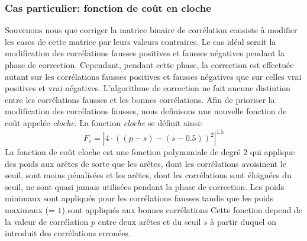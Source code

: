 \documentclass[onecolumn, 12pt]{book}
\begin{document}
\subsubsection{Cas particulier: fonction de co\^ut en cloche}
Souvenons nous que corriger la matrice binaire de corr\'elation consiste \`a modifier les cases de cette matrice par leurs valeurs contraires.
Le cas id\'eal serait la modification des corr\'elations fausses positives et fausses n\'egatives pendant la phase de correction.
Cependant, pendant cette phase, la correction est effectu\'ee autant sur les corr\'elations fausses positives et fausses n\'egatives que sur celles vrai positives et vrai n\'egatives.
L'algorithme de correction ne fait aucune distintion entre les corr\'elations fausses et les bonnes corr\'elations.
Afin de prioriser la modification des corr\'elations fausses, nous definisons une nouvelle fonction de co\^ut appel\'ee {\em cloche}.
\newline
La fonction {\em cloche} se d\'efinit ainsi:
\begin{equation}
	F_c = | 4\cdot((p-s) - (s-0.5))^2 |^{1.5}  
\end{equation}
La fonction de co\^ut cloche est une fonction polynomiale de degr\'e $2$ qui applique des poids aux ar\^etes de sorte que les ar\^etes, dont les corr\'elations avoisinent le seuil, sont moins p\'enalis\'ees et les ar\^etes, dont les corr\'elations sont \'eloign\'ees du seuil, ne sont quasi jamais utilis\'ees pendant la phase de correction. 
Les poids minimaux sont appliqu\'es pour les corr\'elations fausses tandis que les poids maximaux (= $1$) sont appliqu\'es aux bonnes corr\'elations
Cette fonction depend de la valeur de corr\'elation $p$ entre deux ar\^etes et du seuil $s$ \`a partir duquel on introduit des corr\'elations erron\'ees.
\newline
\end{document}
